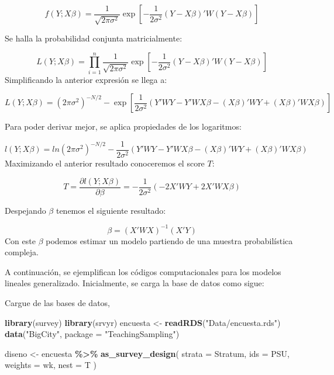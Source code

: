\documentclass[
  12pt,
]{book}
\newenvironment{Shaded}{\begin{snugshade}}{\end{snugshade}}
\newcommand{\AttributeTok}[1]{\textcolor[rgb]{0.13,0.29,0.53}{#1}}
\newcommand{\FunctionTok}[1]{\textcolor[rgb]{0.13,0.29,0.53}{\textbf{#1}}}
\newcommand{\NormalTok}[1]{#1}
\newcommand{\OtherTok}[1]{\textcolor[rgb]{0.56,0.35,0.01}{#1}}
\newcommand{\SpecialCharTok}[1]{\textcolor[rgb]{0.81,0.36,0.00}{\textbf{#1}}}
\newcommand{\StringTok}[1]{\textcolor[rgb]{0.31,0.60,0.02}{#1}}
\begin{document}
\[
f(Y;X\beta)=\dfrac{1}{\sqrt{2\pi\sigma^{2}}}\exp\left[-\dfrac{1}{2\sigma^{2}}(Y-X\beta)'W(Y-X\beta)\right]
\]

Se halla la probabilidad conjunta matricialmente:

\[
L(Y;X\beta)=\prod_{i=1}^{n}\dfrac{1}{\sqrt{2\pi\sigma^{2}}}\exp\left[-\dfrac{1}{2\sigma^{2}}(Y-X\beta)'W(Y-X\beta)\right]
\]
Simplificando la anterior expresión se llega a:

\[
L(Y;X\beta)=(2\pi\sigma^{2})^{-N/2}-\exp\left[\dfrac{1}{2\sigma^{2}}(Y'WY-Y'WX\beta-(X\beta)'WY+(X\beta)'WX\beta)\right]
\]

Para poder derivar mejor, se aplica propiedades de los logaritmos:

\[
l(Y;X\beta)=ln(2\pi\sigma^{2})^{-N/2}-\dfrac{1}{2\sigma^{2}}(Y'WY-Y'WX\beta-(X\beta)'WY+(X\beta)'WX\beta)
\]
Maximizando el anterior resultado conoceremos el score \(T\):

\[
T=\dfrac{\partial l(Y;X\beta)}{\partial\beta}=-\dfrac{1}{2\sigma^{2}}(-2X'WY+2X'WX\beta)
\]

Despejando \(\beta\) tenemos el siguiente resultado:

\[
\beta=(X'WX)^{-1}(X'Y)
\]
Con este \(\beta\) podemos estimar un modelo partiendo de una muestra probabilística compleja.

A continuación, se ejemplifican los códigos computacionales para los modelos lineales generalizado. Inicialmente, se carga la base de datos como sigue:

Cargue de las bases de datos,

\begin{Shaded}
\begin{Highlighting}[]
\FunctionTok{library}\NormalTok{(survey)}
\FunctionTok{library}\NormalTok{(srvyr)}
\NormalTok{encuesta }\OtherTok{\textless{}{-}} \FunctionTok{readRDS}\NormalTok{(}\StringTok{"Data/encuesta.rds"}\NormalTok{)}
\FunctionTok{data}\NormalTok{(}\StringTok{"BigCity"}\NormalTok{, }\AttributeTok{package =} \StringTok{"TeachingSampling"}\NormalTok{)}
\end{Highlighting}
\end{Shaded}

\begin{Shaded}
\begin{Highlighting}[]
\NormalTok{diseno }\OtherTok{\textless{}{-}}\NormalTok{ encuesta }\SpecialCharTok{\%\textgreater{}\%}
  \FunctionTok{as\_survey\_design}\NormalTok{(}
    \AttributeTok{strata =}\NormalTok{ Stratum,}
    \AttributeTok{ids =}\NormalTok{ PSU,}
    \AttributeTok{weights =}\NormalTok{ wk,}
    \AttributeTok{nest =}\NormalTok{ T}
\NormalTok{  )}
\end{Highlighting}
\end{Shaded}
\end{document}

